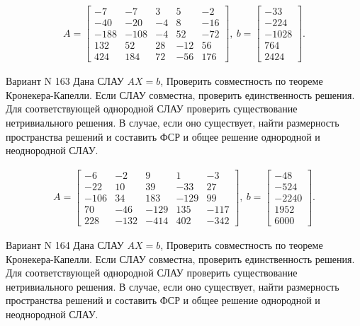\documentclass[11pt]{report}
\begin{document}
\begin{align*}
 A = \left[\begin{matrix}-7 & -7 & 3 & 5 & -2\\-40 & -20 & -4 & 8 & -16\\-188 & -108 & -4 & 52 & -72\\132 & 52 & 28 & -12 & 56\\424 & 184 & 72 & -56 & 176\end{matrix}\right],
\ b = \left[\begin{matrix}-33\\-224\\-1028\\764\\2424\end{matrix}\right]. 
 \end{align*}

Вариант N 163
Дана СЛАУ $AX = b$,
Проверить совместность по теореме Кронекера-Капелли. Если СЛАУ совместна, проверить единственность решения.
Для соответствующей однородной СЛАУ проверить существование нетривиального решения. В случае, если оно существует,
найти размерность пространства решений и составить ФСР и общее решение однородной  и неоднородной СЛАУ.


\begin{align*}
 A = \left[\begin{matrix}-6 & -2 & 9 & 1 & -3\\-22 & 10 & 39 & -33 & 27\\-106 & 34 & 183 & -129 & 99\\70 & -46 & -129 & 135 & -117\\228 & -132 & -414 & 402 & -342\end{matrix}\right],
\ b = \left[\begin{matrix}-48\\-524\\-2240\\1952\\6000\end{matrix}\right]. 
 \end{align*}

Вариант N 164
Дана СЛАУ $AX = b$,
Проверить совместность по теореме Кронекера-Капелли. Если СЛАУ совместна, проверить единственность решения.
Для соответствующей однородной СЛАУ проверить существование нетривиального решения. В случае, если оно существует,
найти размерность пространства решений и составить ФСР и общее решение однородной  и неоднородной СЛАУ.
\end{document}
